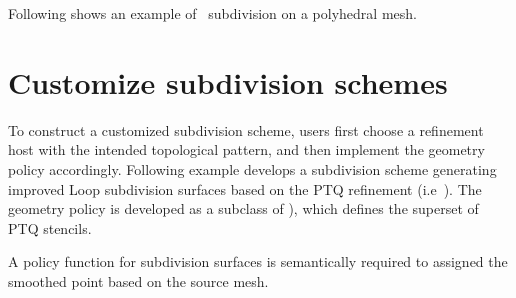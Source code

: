 Following shows an example of \DS\ subdivision on a polyhedral mesh.

\section{Customize subdivision schemes}
To construct a customized subdivision scheme, users first choose a 
refinement host with the intended topological pattern, and then 
implement the geometry policy accordingly. 
Following example develops a subdivision scheme
generating improved Loop subdivision surfaces based on the PTQ 
refinement (i.e~). 
The geometry policy is developed as a subclass 
of ), which defines the superset of PTQ stencils.

A policy function for subdivision surfaces is semantically
required to assigned the smoothed point based on the source mesh.

